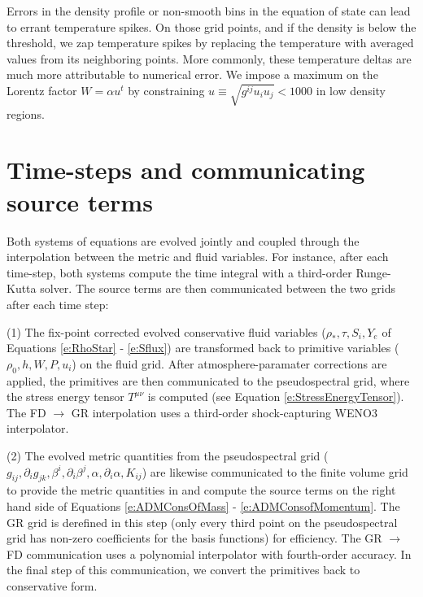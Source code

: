 Errors in the density profile or non-smooth bins in the equation of state can lead to errant temperature spikes.  On those grid points, and if the density is below the threshold, we zap temperature spikes by replacing the temperature with averaged values from its neighboring points.  More commonly, these temperature deltas are much more attributable to numerical error.  We impose a maximum on the Lorentz factor $W = \alpha u^t$ by constraining $u \equiv \sqrt{g^{ij} u_i u_j} < 1000$ in low density regions.


\section{Time-steps and communicating source terms}
\label{sec:communication}

Both systems of equations are evolved jointly and coupled through the interpolation between the metric and fluid variables. 
For instance, after each time-step, both systems compute the time integral with a third-order Runge-Kutta solver.
The source terms are then communicated between the two grids after each time step:

(1) The fix-point corrected evolved conservative fluid variables ($\rho_*, \tau, S_i, Y_e$ of Equations \ref{e:RhoStar} - \ref{e:Sflux}) are transformed back to primitive variables ($\rho_0, h, W, P, u_i$) on the fluid grid.  After atmosphere-paramater corrections are applied, the primitives are then communicated to the pseudospectral grid, where the stress energy tensor $T^{\mu\nu}$ is computed (see Equation \ref{e:StressEnergyTensor}).  The FD $\rightarrow$ GR interpolation uses a third-order shock-capturing WENO3 interpolator. 

(2) The evolved metric quantities from the pseudospectral grid ($g_{ij}, \partial_i g_{jk}, \beta^i, \partial_i \beta^j, \alpha, \partial_i \alpha,  K_{ij}$) are likewise communicated to the finite volume grid to provide the metric quantities in and compute the source terms on the right hand side of Equations \ref{e:ADMConsOfMass} - \ref{e:ADMConsofMomentum}.  The GR grid is derefined in this step (only every third point on the pseudospectral grid has non-zero coefficients for the basis functions) for efficiency.  The GR $\rightarrow$ FD communication uses a polynomial interpolator with fourth-order accuracy.
In the final step of this communication, we convert the primitives back to conservative form.

